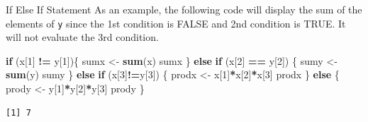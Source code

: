 \documentclass[
  ignorenonframetext,
]{beamer}
\newenvironment{Shaded}{\begin{snugshade}}{\end{snugshade}}
\newcommand{\ControlFlowTok}[1]{\textcolor[rgb]{0.13,0.29,0.53}{\textbf{#1}}}
\newcommand{\DecValTok}[1]{\textcolor[rgb]{0.00,0.00,0.81}{#1}}
\newcommand{\FunctionTok}[1]{\textcolor[rgb]{0.13,0.29,0.53}{\textbf{#1}}}
\newcommand{\NormalTok}[1]{#1}
\newcommand{\OtherTok}[1]{\textcolor[rgb]{0.56,0.35,0.01}{#1}}
\newcommand{\SpecialCharTok}[1]{\textcolor[rgb]{0.81,0.36,0.00}{\textbf{#1}}}
\begin{document}
\begin{frame}[fragile]{If Else If Statement}
\protect\hypertarget{if-else-if-statement-1}{}
As an example, the following code will display the sum of the elements
of \texttt{y} since the 1st condition is FALSE and 2nd condition is
TRUE. It will not evaluate the 3rd condition.

\tiny

\begin{Shaded}
\begin{Highlighting}[]
\ControlFlowTok{if}\NormalTok{ (x[}\DecValTok{1}\NormalTok{] }\SpecialCharTok{!=}\NormalTok{ y[}\DecValTok{1}\NormalTok{])\{}
\NormalTok{   sumx }\OtherTok{\textless{}{-}} \FunctionTok{sum}\NormalTok{(x)}
\NormalTok{   sumx}
\NormalTok{  \} }\ControlFlowTok{else} \ControlFlowTok{if}\NormalTok{ (x[}\DecValTok{2}\NormalTok{] }\SpecialCharTok{==}\NormalTok{ y[}\DecValTok{2}\NormalTok{]) \{}
\NormalTok{   sumy }\OtherTok{\textless{}{-}} \FunctionTok{sum}\NormalTok{(y)}
\NormalTok{   sumy}
\NormalTok{   \} }\ControlFlowTok{else} \ControlFlowTok{if}\NormalTok{ (x[}\DecValTok{3}\NormalTok{]}\SpecialCharTok{!=}\NormalTok{y[}\DecValTok{3}\NormalTok{]) \{}
\NormalTok{   prodx }\OtherTok{\textless{}{-}}\NormalTok{ x[}\DecValTok{1}\NormalTok{]}\SpecialCharTok{*}\NormalTok{x[}\DecValTok{2}\NormalTok{]}\SpecialCharTok{*}\NormalTok{x[}\DecValTok{3}\NormalTok{]}
\NormalTok{   prodx}
\NormalTok{   \} }\ControlFlowTok{else}\NormalTok{ \{}
\NormalTok{   prody }\OtherTok{\textless{}{-}}\NormalTok{ y[}\DecValTok{1}\NormalTok{]}\SpecialCharTok{*}\NormalTok{y[}\DecValTok{2}\NormalTok{]}\SpecialCharTok{*}\NormalTok{y[}\DecValTok{3}\NormalTok{]}
\NormalTok{   prody}
\NormalTok{\}}
\end{Highlighting}
\end{Shaded}

\begin{verbatim}
[1] 7
\end{verbatim}

\normalsize
\end{frame}
\end{document}
